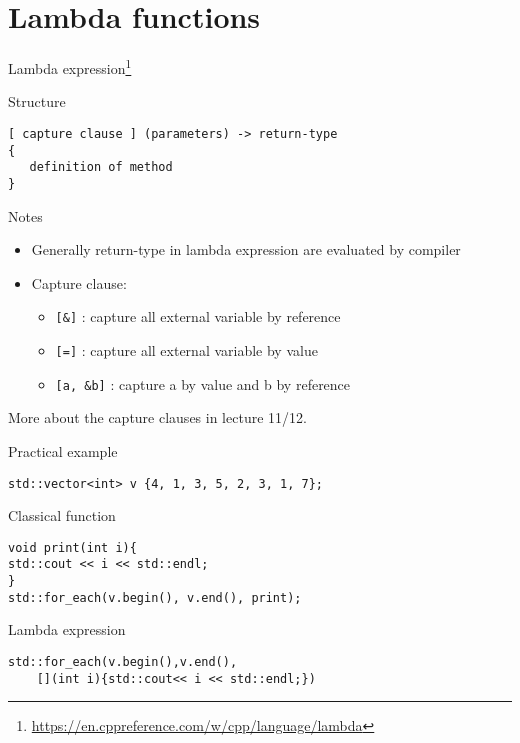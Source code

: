 \documentclass[12pt,t]{beamer}
\begin{document}
\section{Lambda functions}

\begin{frame}[fragile]{Lambda expression\footnote{\tiny{\url{https://en.cppreference.com/w/cpp/language/lambda}}} }

\begin{block}{Structure}
\begin{lstlisting}
[ capture clause ] (parameters) -> return-type  
{   
   definition of method   
} 
\end{lstlisting}
\end{block}

\begin{block}{Notes}
\begin{itemize}
\item Generally return-type in lambda expression are evaluated by compiler
\item Capture clause:
\begin{itemize}
\item  \lstinline|[&]| : capture all external variable by reference
\item  \lstinline|[=]| : capture all external variable by value
\item  \lstinline|[a, &b]| : capture a by value and b by reference
\end{itemize}
\end{itemize}
\end{block}
\vspace{-0.2cm}
\begin{center}
More about the capture clauses in lecture 11/12.
\end{center}
\end{frame}

\begin{frame}[fragile]{Practical example}
\begin{lstlisting}
std::vector<int> v {4, 1, 3, 5, 2, 3, 1, 7}; 

\end{lstlisting}


\begin{block}{Classical function}
\begin{lstlisting}
void print(int i){
std::cout << i << std::endl;
}
std::for_each(v.begin(), v.end(), print); 
\end{lstlisting}
\end{block}

\begin{block}{Lambda expression}
\begin{lstlisting}
std::for_each(v.begin(),v.end(),
	[](int i){std::cout<< i << std::endl;})
\end{lstlisting}
\end{block}


\end{frame}
     
\end{document}
